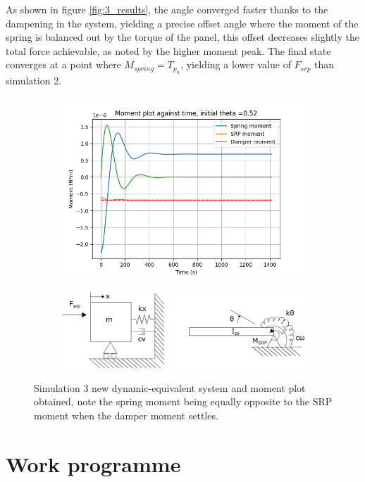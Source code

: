 As shown in figure \ref{fig:3_results}, the angle converged faster thanks to the dampening in the system, yielding a precise offset angle where the moment of the spring is balanced out by the torque of the panel, this offset decreases slightly the total force achievable, as noted by the higher moment peak. The final state converges at a point where $M_{spring} = T_{p_n}$, yielding a lower value of $F_{srp}$ than simulation 2.

\begin{figure}[!htb]
\centering
\begin{subfigure}{0.5\textwidth}
  \centering
  \includegraphics[width=0.7\linewidth]{images/third/moment_plot.png}
  \label{fig:3_moment}
\end{subfigure}%
\begin{subfigure}{.5\textwidth}
  \centering
  \includegraphics[width=1\linewidth]{images/spring damp system.png}
  \label{fig:3_dynsym}
\end{subfigure}
\caption{Simulation 3 new dynamic-equivalent system and moment plot obtained, note the spring moment being equally opposite to the SRP moment when the damper moment settles. }
\label{fig:3_system}
\end{figure}

\section{Work programme}

